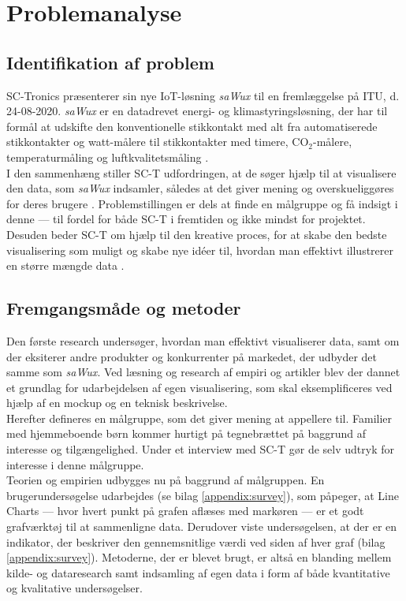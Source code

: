 \chapter{Problemanalyse}
\section{Identifikation af problem}
SC-Tronics præsenterer sin nye IoT-løsning \emph{saWux} til en fremlæggelse på ITU, d. 24-08-2020. \emph{saWux} er en datadrevet energi- og klimastyringsløsning, der har til formål at udskifte den konventionelle stikkontakt med alt fra automatiserede stikkontakter og watt-målere til stikkontakter med timere, CO$_2$-målere, temperaturmåling og luftkvalitetsmåling \citep{sawux}.\\

I den sammenhæng stiller SC-T udfordringen, at de søger hjælp til at visualisere den data, som \emph{saWux} indsamler, således at det giver mening og overskueliggøres for deres brugere \citep{virksomhedspresentation}. Problemstillingen er dels at finde en målgruppe og få indsigt i denne — til fordel for både SC-T i fremtiden og ikke mindst for projektet. Desuden beder SC-T om hjælp til den kreative proces, for at skabe den bedste visualisering som muligt og skabe nye idéer til, hvordan man effektivt illustrerer en større mængde data \citep{virksomhedspresentation}.\\

\section{Fremgangsmåde og metoder}
Den første research undersøger, hvordan man effektivt visualiserer data, samt om der eksiterer andre produkter og konkurrenter på markedet, der udbyder det samme som \emph{saWux}. Ved læsning og research af empiri og artikler blev der dannet et grundlag for udarbejdelsen af egen visualisering, som skal eksemplificeres ved hjælp af en mockup og en teknisk beskrivelse.\\

Herefter defineres en målgruppe, som det giver mening at appellere til. Familier med hjemmeboende børn kommer hurtigt på tegnebrættet på baggrund af interesse og tilgængelighed. Under et interview med SC-T gør de selv udtryk for interesse i denne målgruppe.\\

Teorien og empirien udbygges nu på baggrund af målgruppen. En brugerundersøgelse udarbejdes (se bilag \ref{appendix:survey}), som påpeger, at Line Charts — hvor hvert punkt på grafen aflæses med markøren — er et godt grafværktøj til at sammenligne data. Derudover viste undersøgelsen, at der er en indikator, der beskriver den gennemsnitlige værdi ved siden af hver graf (bilag \ref{appendix:survey}). Metoderne, der er blevet brugt, er altså en blanding mellem kilde- og dataresearch samt indsamling af egen data i form af både kvantitative og kvalitative undersøgelser.\\

